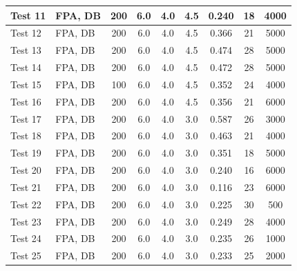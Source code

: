 \begin{table}[!h]
\begin{center}
\begin{tabular}{|l|l|c|c|c|c|c|c|c|}
Test 11    &  FPA, DB           &  200            &  6.0       &  4.0       &  4.5       &  0.240          &  18                    &  4000              \\ \hline
Test 12    &  FPA, DB           &  200            &  6.0       &  4.0       &  4.5       &  0.366          &  21                    &  5000              \\ \hline
Test 13    &  FPA, DB           &  200            &  6.0       &  4.0       &  4.5       &  0.474          &  28                    &  5000              \\ \hline
Test 14    &  FPA, DB           &  200            &  6.0       &  4.0       &  4.5       &  0.472          &  28                    &  5000              \\ \hline
Test 15    &  FPA, DB           &  100            &  6.0       &  4.0       &  4.5       &  0.352          &  24                    &  4000              \\ \hline
Test 16    &  FPA, DB           &  200            &  6.0       &  4.0       &  4.5       &  0.356          &  21                    &  6000              \\ \hline
Test 17    &  FPA, DB           &  200            &  6.0       &  4.0       &  3.0       &  0.587          &  26                    &  3000              \\ \hline
Test 18    &  FPA, DB           &  200            &  6.0       &  4.0       &  3.0       &  0.463          &  21                    &  4000              \\ \hline
Test 19    &  FPA, DB           &  200            &  6.0       &  4.0       &  3.0       &  0.351          &  18                    &  5000              \\ \hline
Test 20    &  FPA, DB           &  200            &  6.0       &  4.0       &  3.0       &  0.240          &  16                    &  6000              \\ \hline
Test 21    &  FPA, DB           &  200            &  6.0       &  4.0       &  3.0       &  0.116          &  23                    &  6000              \\ \hline
Test 22    &  FPA, DB           &  200            &  6.0       &  4.0       &  3.0       &  0.225          &  30                    &  500               \\ \hline
Test 23    &  FPA, DB           &  200            &  6.0       &  4.0       &  3.0       &  0.249          &  28                    &  4000              \\ \hline
Test 24    &  FPA, DB           &  200            &  6.0       &  4.0       &  3.0       &  0.235          &  26                    &  1000              \\ \hline
Test 25    &  FPA, DB           &  200            &  6.0       &  4.0       &  3.0       &  0.233          &  25                    &  2000              \\ \hline
\end{tabular}
\end{center}
\end{table}

